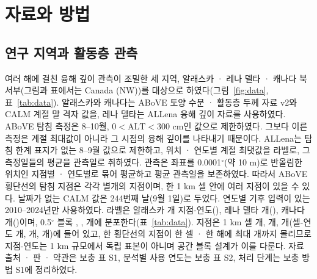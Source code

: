 \section{자료와 방법}\label{sec:methods}

\subsection{연구 지역과 활동층 관측}
여러 해에 걸친 융해 깊이 관측이 조밀한 세 지역, 알래스카 · 레나 델타 · 캐나다 북서부(그림과 표에서는 Canada (NW))를 대상으로 하였다(그림~\ref{fig:data}, 표~\ref{tab:data}). 알래스카와 캐나다는 ABoVE 토양 수분 · 활동층 두께 자료 v2\cite{Moore2025}와 CALM 계절 말 격자 값\cite{Streletskiy2025}을, 레나 델타는 ALLena 융해 깊이 자료\cite{Veremeeva2025}를 사용하였다. ABoVE 탐침 측정은 8--10월, $0<\mathrm{ALT}<300$ cm인 값으로 제한하였다. 그보다 이른 측정은 계절 최대값이 아니라 그 시점의 융해 깊이를 나타내기 때문이다. ALLena는 탐침 한계 표지가 없는 8--9월 값으로 제한하고, 위치 · 연도별 계절 최댓값을 라벨로, 그 측정일들의 평균을 관측일로 취하였다. 관측은 좌표를 0.0001$^\circ$(약 10 m)로 반올림한 위치인 지점별 · 연도별로 묶어 평균하고 평균 관측일을 보존하였다. 따라서 ABoVE 횡단선의 탐침 지점은 각각 별개의 지점이며, 한 1 km 셀 안에 여러 지점이 있을 수 있다. 날짜가 없는 CALM 값은 244번째 날(9월 1일)로 두었다. 연도별 기후 입력이 있는 2010--2024년만 사용하였다. 라벨은 알래스카 \nncyAk{}개 지점-연도(\nyrsAkko), 레나 델타 \nncyLe{}개(\nyrsLeko), 캐나다 \nncyCa{}개(\nyrsCako)이며, 0.5$^\circ$ 블록 \nnblkAk, \nnblkLe, \nnblkCa{}개에 분포한다(표~\ref{tab:data}). 지점은 1 km 셀 \nnkmcellAk{}개, \nnkmcellLe{}개, \nnkmcellCa{}개(셀-연도 \nnkmcyAk{}개, \nnkmcyLe{}개, \nnkmcyCa{}개)에 들어 있고, 한 횡단선의 지점이 한 셀 · 한 해에 최대 \nnkmmaxAk{}개까지 몰리므로 지점-연도는 1 km 규모에서 독립 표본이 아니며 공간 블록 설계가 이를 다룬다. 자료 출처 · 판 · 약관은 보충 표 S1, 분석별 사용 연도는 보충 표 S2, 처리 단계는 보충 방법 S1에 정리하였다.





